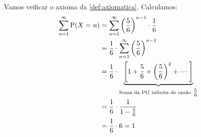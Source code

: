 \begin{example}
\begin{center}
    \end{center}

    Vamos veificar o axioma  da \cref{def:axiomatica}. 
    Calculamos:
    \begin{align*}
        \sum_{n=1}^\infty \operatorname{P}(X = n)
        &= \sum_{n=1}^\infty \left(\frac{5}{6}\right)^{n-1} \cdot \frac{1}{6} \\
        &= \frac{1}{6} \cdot \sum_{n=1}^\infty \left(\frac{5}{6}\right)^{n-1} \\
        &= \frac{1}{6}
            \cdot \underbrace{
                \left[1 + \frac{5}{6} + \left(\frac{5}{6}\right)^2 + \cdots\right]
            }_{\text{Soma da PG infinita de razão}\ {\textstyle\frac{5}{6}}}\\
        &= \frac{1}{6} \cdot \frac{1}{1 - \frac{5}{6}} \\
        &= \frac{1}{6} \cdot 6 = 1
    \end{align*}
\end{example}
